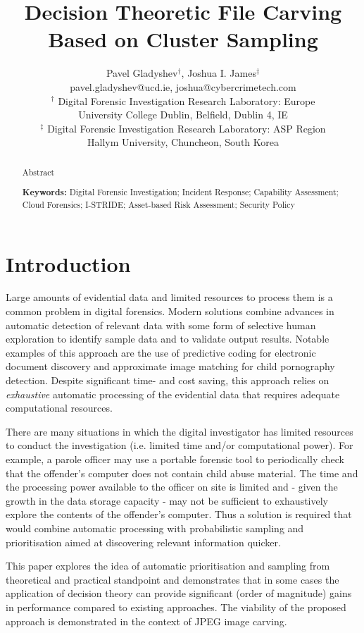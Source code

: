 \documentclass[10pt,a4paper]{article}
\author{Pavel Gladyshev$^\dagger$, Joshua I. James$^\ddagger$\\
	pavel.gladyshev@ucd.ie, joshua@cybercrimetech.com\\
	$^\dagger$ Digital Forensic Investigation Research Laboratory: Europe\\
	University College Dublin, Belfield, Dublin 4, IE\\
	$^\ddagger$ Digital Forensic Investigation Research Laboratory: ASP Region\\
	Hallym University, Chuncheon, South Korea}
\title{Decision Theoretic File Carving Based on Cluster Sampling}
\date{}
\begin{document}
	\maketitle
	\begin{abstract}
		\noindent Abstract
		
			\noindent\textbf{Keywords:} Digital Forensic Investigation; Incident Response; Capability Assessment; Cloud Forensics; I-STRIDE; Asset-based Risk Assessment; Security Policy
	\end{abstract}

\section{Introduction}

Large amounts of evidential data and limited resources to process them is a common problem in digital forensics. Modern solutions combine advances in automatic detection of relevant data with some form of selective human exploration to identify sample data and to validate output results. Notable examples of this approach are the use of predictive coding for electronic document discovery and approximate image matching for child pornography detection. Despite significant time- and cost saving, this approach relies on \emph{exhaustive} automatic processing of the evidential data that requires adequate computational resources. 

There are many situations in which the digital investigator has limited resources to conduct the investigation (i.e. limited time and/or computational power). For example, a parole officer may use a portable forensic tool to periodically check that the offender's computer does not contain child abuse material. The time and the processing power available to the officer on site is limited and - given the growth in the data storage capacity - may not be sufficient to exhaustively explore the contents of the offender's computer. Thus a solution is required that would combine automatic processing with probabilistic sampling and prioritisation aimed at discovering relevant information quicker.

This paper explores the idea of automatic prioritisation and sampling from theoretical and practical standpoint and demonstrates that in some cases the application of decision theory can provide significant (order of magnitude) gains in performance compared to existing approaches. The viability of the proposed approach is demonstrated in the context of JPEG image carving.
\end{document}
